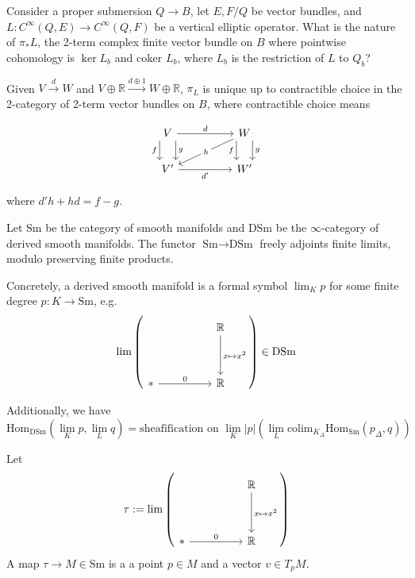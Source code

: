 \begin{example}

Consider a proper submersion $Q\to B$, let $E,F/Q$ be vector bundles, and $L:C^\infty(Q,E)\to C^\infty(Q,F)$ be a vertical elliptic operator. What is the nature of $\pi_*L$, the 2-term complex finite vector bundle on $B$ where pointwise cohomology is $\ker L_b$ and $\text{coker }L_b$, where $L_b$ is the restriction of $L$ to $Q_b$?

Given $V\stackrel{d}{\longrightarrow} W$ and $V\oplus \mathbb{R} \stackrel{d\oplus 1}{\longrightarrow} W\oplus \mathbb{R}$, $\pi_L$ is unique up to contractible choice in the 2-category of 2-term vector bundles on $B$, where contractible choice means

\[\begin{tikzcd}
	V && W \\
	{V'} && {W'}
	\arrow["d", from=1-1, to=1-3]
	\arrow["f"', shift right=3, from=1-1, to=2-1]
	\arrow["g", shift left=3, from=1-1, to=2-1]
	\arrow["h"{description}, from=1-3, to=2-1]
	\arrow["g", shift left=3, from=1-3, to=2-3]
	\arrow["f"', shift right=3, from=1-3, to=2-3]
	\arrow["{d'}"', from=2-1, to=2-3]
\end{tikzcd}\]

where $d'h+hd=f-g$.

\end{example}

Let $\text{Sm}$ be the category of smooth manifolds and $\text{DSm}$ be the $\infty$-category of derived smooth manifolds. The functor $\text{Sm}\to \text{DSm}$ freely adjoints finite limits, modulo preserving finite products.

Concretely, a derived smooth manifold is a formal symbol $\lim_K p$ for some finite degree $p: K\to \text{Sm}$, e.g.
\[
\lim\left( \begin{tikzcd}
	&& {\mathbb{R}} \\
	\\
	{*} && {\mathbb{R}}
	\arrow["{x\mapsto x^2}", from=1-3, to=3-3]
	\arrow["0", from=3-1, to=3-3]
\end{tikzcd} \right) \in \text{DSm}
\]

Additionally, we have
\[
\text{Hom}_{\text{DSm}}(\lim_K p, \lim_L q) =\text{sheafification on }\lim_K|p| \left( \lim_L \text{colim}_{K_\Delta} \text{Hom}_{\text{Sm}}(p_\Delta, q) \right)
\]

\begin{example}

Let
\[
\tau:= \lim\left(\begin{tikzcd}
	&& {\mathbb{R}} \\
	\\
	{*} && {\mathbb{R}}
	\arrow["{x\mapsto x^2}", from=1-3, to=3-3]
	\arrow["0", from=3-1, to=3-3]
\end{tikzcd}\right)
\]
A map $\tau \to M \in \text{Sm}$ is a a point $p\in M$ and a vector $v\in T_pM$.

\end{example}

